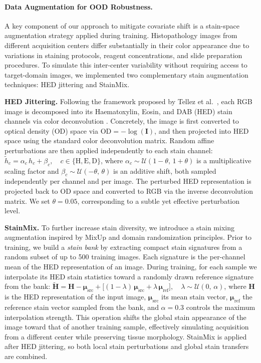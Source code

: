\documentclass{midl}
\begin{document}
\paragraph{Data Augmentation for OOD Robustness.}

A key component of our approach to mitigate covariate shift is a stain-space augmentation strategy applied during training. Histopathology images from different acquisition centers differ substantially in their color appearance due to variations in staining protocols, reagent concentrations, and slide preparation procedures. To simulate this inter-center variability without requiring access to target-domain images, we implemented two complementary stain augmentation techniques: HED jittering and StainMix.

\textbf{HED Jittering.} Following the framework proposed by Tellez et al.\ \cite{tellez2019quantifying}, each RGB image is decomposed into its Haematoxylin, Eosin, and DAB (HED) stain channels via color deconvolution \cite{ruifrok2001quantification}. Concretely, the image is first converted to optical density (OD) space via $\mathrm{OD} = -\log(\mathbf{I})$, and then projected into HED space using the standard color deconvolution matrix. Random affine perturbations are then applied independently to each stain channel: $\tilde{h}_c = \alpha_c \, h_c + \beta_c, \quad c \in \{\text{H}, \text{E}, \text{D}\}$,
where $\alpha_c \sim \mathcal{U}(1-\theta,\, 1+\theta)$ is a multiplicative scaling factor and $\beta_c \sim \mathcal{U}(-\theta,\, \theta)$ is an additive shift, both sampled independently per channel and per image. The perturbed HED representation is projected back to OD space and converted to RGB via the inverse deconvolution matrix. We set $\theta = 0.05$, corresponding to a subtle yet effective perturbation level. 

\textbf{StainMix.} To further increase stain diversity, we introduce a stain mixing augmentation inspired by MixUp \cite{zhang2018mixup} and domain randomization principles. Prior to training, we build a \emph{stain bank} by extracting compact stain signatures from a random subset of up to 500 training images. Each signature is the per-channel mean of the HED representation of an image. During training, for each sample we interpolate its HED stain statistics toward a randomly drawn reference signature from the bank: $\widetilde{\mathbf{H}} = \mathbf{H} - \boldsymbol{\mu}_\text{src} + \bigl[(1-\lambda)\,\boldsymbol{\mu}_\text{src} + \lambda\,\boldsymbol{\mu}_\text{ref}\bigr],
    \quad \lambda \sim \mathcal{U}(0,\, \alpha)$,
where $\mathbf{H}$ is the HED representation of the input image, $\boldsymbol{\mu}_\text{src}$ its mean stain vector, $\boldsymbol{\mu}_\text{ref}$ the reference stain vector sampled from the bank, and $\alpha = 0.3$ controls the maximum interpolation strength. This operation shifts the global stain appearance of the image toward that of another training sample, effectively simulating acquisition from a different center while preserving tissue morphology. StainMix is applied after HED jittering, so both local stain perturbations and global stain transfers are combined.
\end{document}
